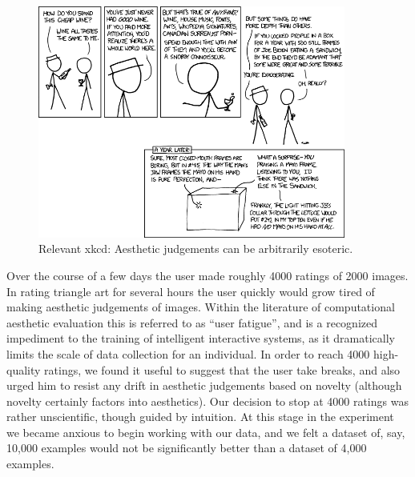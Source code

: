 \documentclass[midd]{thesis}
\begin{document}
\begin{figure}
\centering
\includegraphics[width=0.9\textwidth]{visualizations/connoisseur.png}
\caption{Relevant xkcd: Aesthetic judgements can be arbitrarily esoteric.}
\label{fig:effectivecomplexity}
\end{figure}

Over the course of a few days the user made roughly 4000 ratings of 2000 images. In rating triangle art for several hours the user quickly would grow tired of making aesthetic judgements of images. Within the literature of computational aesthetic evaluation this is referred to as ``user fatigue'', and is a recognized impediment to the training of intelligent interactive systems, as it dramatically limits the scale of data collection for an individual. In order to reach 4000 high-quality ratings, we found it useful to suggest that the user take breaks, and also urged him to resist any drift in aesthetic judgements based on novelty (although novelty certainly factors into aesthetics). Our decision to stop at 4000 ratings was rather unscientific, though guided by intuition. At this stage in the experiment we became anxious to begin working with our data, and we felt a dataset of, say, 10,000 examples would not be significantly better than a dataset of 4,000 examples. 
\end{document}
